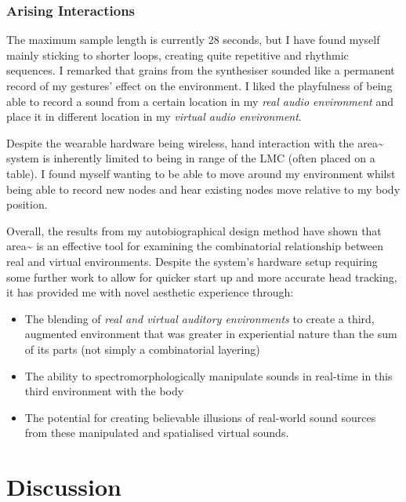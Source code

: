 \subsubsection{Arising Interactions}            \label{sec: area-study-results-arisingints}
The maximum sample length is currently 28 seconds, but I have found myself mainly sticking to shorter loops, creating quite repetitive and rhythmic sequences. I remarked that grains from the synthesiser sounded like a permanent record of my gestures’ effect on the environment. I liked the playfulness of being able to record a sound from a certain location in my \textit{real audio environment} and place it in different location in my \textit{virtual audio environment}.

Despite the wearable hardware being wireless, hand interaction with the area\textasciitilde{} system is inherently limited to being in range of the LMC (often placed on a table). I found myself wanting to be able to move around my environment whilst being able to record new nodes and hear existing nodes move relative to my body position.

Overall, the results from my autobiographical design method have shown that area\textasciitilde{} is an effective tool for examining the combinatorial relationship between real and virtual environments. Despite the system’s hardware setup requiring some further work to allow for quicker start up and more accurate head tracking, it has provided me with novel aesthetic experience through:
\begin{itemize}
    \item The blending of \textit{real and virtual auditory environments} to create a third, augmented environment that was greater in experiential nature than the sum of its parts (not simply a combinatorial layering)
    \item The ability to spectromorphologically manipulate sounds in real-time in this third environment with the body
    \item The potential for creating believable illusions of real-world sound sources from these manipulated and spatialised virtual sounds.
\end{itemize}

\section{Discussion}                            \label{sec: area-discussion}

